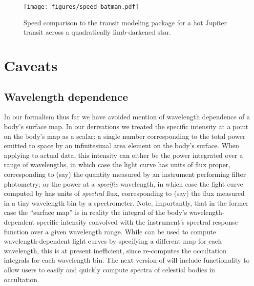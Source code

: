 \documentclass[modern]{aastex61}
\begin{document}
\begin{figure}[p!]
    \begin{centering}
    \texttt{[image: figures/speed\_batman.pdf]}
    \caption{\label{fig:speed_batman}
             Speed comparison to the \batman transit modeling package
             \citep{Kreidberg2015} for a hot Jupiter transit across a
             quadratically limb-darkened star.
             }
    \end{centering}
\end{figure}

\section{Caveats}
\label{sec:caveats}

\subsection{Wavelength dependence}
In our formalism thus far we have avoided mention of wavelength dependence
of a body's surface map. In our derivations we treated the specific intensity at a point
on the body's map as a scalar: a single number corresponding to the total power
emitted to space by an infinitesimal area element on the body's surface.
When applying \starry to actual data, this intensity can either
be the power integrated over a range of wavelengths, in which case the light curve
has units of flux proper,
corresponding to (say) the quantity measured by an instrument performing filter
photometry; or the power at a \emph{specific} wavelength, in which case the light curve
computed by \starry has units of \emph{spectral} flux, corresponding to (say) the
flux measured in a tiny wavelength bin by a spectrometer. Note, importantly,
that in the former case the ``surface map'' is in reality the integral of the body's
wavelength-dependent specific intensity convolved with the instrument's spectral
response function over a given wavelength range. While \starry can be used to
compute wavelength-dependent light curves by specifying a different map
for each wavelength, this is at present inefficient, since \starry re-computes
the occultation integrals for each wavelength bin. The next version of \starry
will include functionality to allow users to easily and quickly compute
spectra of celestial bodies in occultation.
\end{document}
